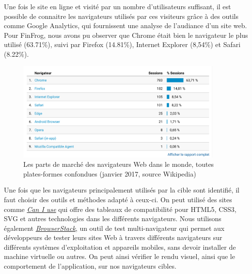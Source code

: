 \bigskip

Une fois le site en ligne et visité par un nombre d'utilisateurs
suffisant, il est possible de connaitre les navigateurs utilisés par ces
visiteurs grâce à des outils comme Google Analytics, qui fournissent une
analyse de l'audiance d'un site web. Pour FinFrog, nous avons pu
observer que Chrome était bien le navigateur le plus utilisé (63.71\%),
suivi par Firefox (14.81\%), Internet Explorer (8,54\%) et Safari
(8.22\%).

\begin{figure}[h]
  \centering
  \includegraphics[height=5cm]{figures/FF-browsers.png}
  \caption{Les parts de marché des navigateurs Web dans le monde, toutes plates-formes confondues (janvier 2017, source Wikipedia)}
\end{figure}

\bigskip

Une fois que les navigateurs principalement utilisés par la cible sont
identifié, il faut choisir des outils et méthodes adapté à ceux-ci. On
peut utilisé des sites comme \href{http://caniuse.com/}{\emph{Can I
use}} qui offre des tableaux de compatibilité pour HTML5, CSS3, SVG et
autres technologies dans les différents navigateurs. Nous utilisons
également \href{https://www.browserstack.com/}{\emph{BrowserStack}}, un
outil de test multi-navigateur qui permet aux développeurs de tester
leurs sites Web à travers différents navigateurs sur différents systèmes
d'exploitation et appareils mobiles, sans devoir installer de machine
virtuelle ou autres. On peut ainsi vérifier le rendu visuel, ainsi que
le comportement de l'application, sur nos navigateurs cibles.

\bigskip

